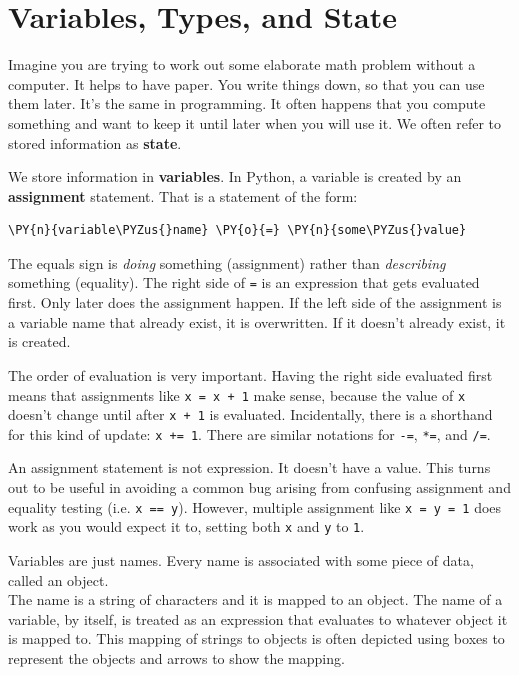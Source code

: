 \section{Variables, Types,  and State}


Imagine you are trying to work out some elaborate math problem without a computer.   It helps to have paper.  You write things down, so that you can use them later.  It's the same in programming.  It often happens that you compute something and want to keep it until later when you will use it.  We often refer to stored information as \textbf{state}.  


We store information in \textbf{variables}.  In Python, a variable is created by an \textbf{assignment} statement.  That is a statement of the form:

\begin{Verbatim}[commandchars=\\\{\}]
\PY{n}{variable\PYZus{}name} \PY{o}{=} \PY{n}{some\PYZus{}value}
\end{Verbatim}



The equals sign is \emph{doing} something (assignment) rather than \emph{describing} something (equality).
The right side of \texttt{=} is an expression that gets evaluated first.  Only later does the assignment happen.
If the left side of the assignment is a variable name that already exist, it is overwritten.
If it doesn’t already exist, it is created.  


The order of evaluation is very important.  Having the right side evaluated first means that assignments like \texttt{x = x + 1} make sense, because the value of \texttt{x} doesn’t change until after \texttt{x + 1} is evaluated.  Incidentally, there is a shorthand for this kind of update: \texttt{x += 1}.  There are similar notations for \texttt{-=}, \texttt{*=}, and \texttt{/=}.


An assignment statement is not expression.  It doesn’t have a value.  This turns out to be useful in avoiding a common bug arising from confusing assignment and equality testing (i.e. \texttt{x == y}).  However, multiple assignment like \texttt{x = y = 1} does work as you would expect it to, setting both \texttt{x} and \texttt{y} to \texttt{1}.


Variables are  just names.  Every name is associated with some piece of data, called an object.\\
The name is a string of characters and it is mapped to an object.
The name of a variable, by itself, is treated as an expression that evaluates to whatever object it is mapped to.
This mapping of strings to objects is often depicted using boxes to represent the objects and arrows to show the mapping.


